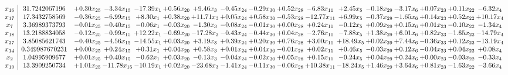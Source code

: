 \documentclass[9pt]{article}
\begin{document}
 \[\begin{array}{c| c c@{\hskip 2pt} c@{\hskip 2pt} c@{\hskip 2pt} c@{\hskip 2pt} c@{\hskip 2pt} c@{\hskip 2pt} c@{\hskip 2pt} c@{\hskip 2pt} c@{\hskip 2pt} c@{\hskip 2pt} c@{\hskip 2pt} c@{\hskip 2pt} c@{\hskip 2pt} c@{\hskip 2pt} c@{\hskip 2pt} }
 x_{16}   &  31.7242067196 & +  0.30 x_{25} & -3.34 x_{15} & -17.39 x_{1} & +  0.56 x_{20} & +  9.46 x_{3} & -0.45 x_{24} & -0.29 x_{30} & +  0.52 x_{28} & -6.83 x_{11} & +  2.45 x_{5} & -0.18 x_{29} & -3.17 x_{6} & +  0.07 x_{23} & +  0.11 x_{22} & -6.32 x_{4}\\
 x_{17}   &  17.3432758569 & -0.36 x_{25} & -6.99 x_{15} & +  8.30 x_{1} & +  0.38 x_{20} & + 11.71 x_{3} & +  0.05 x_{24} & +  0.58 x_{30} & -0.53 x_{28} & -12.77 x_{11} & +  6.99 x_{5} & -0.37 x_{29} & -1.65 x_{6} & +  0.14 x_{23} & +  0.52 x_{22} & + 10.17 x_{4}\\
 x_{7}   &  3.36989373793 & -0.01 x_{25} & -0.40 x_{15} & -0.06 x_{1} & -0.03 x_{20} & -1.30 x_{3} & -0.08 x_{24} & -0.01 x_{30} & +  0.00 x_{28} & +  0.24 x_{11} & -0.12 x_{5} & +  0.09 x_{29} & +  0.15 x_{6} & +  0.01 x_{23} & -0.10 x_{22} & -1.34 x_{4}\\
 x_{18}   &  13.2188834058 & -0.12 x_{25} & -0.99 x_{15} & + 12.22 x_{1} & -0.69 x_{20} & -17.28 x_{3} & -0.43 x_{24} & -0.44 x_{30} & +  0.04 x_{28} & -2.76 x_{11} & -7.88 x_{5} & +  1.38 x_{29} & +  6.01 x_{6} & +  0.82 x_{23} & -1.65 x_{22} & -14.79 x_{4}\\
 x_{27}   &  3.85085621743 & -0.40 x_{25} & -4.56 x_{15} & -14.55 x_{1} & +  0.03 x_{20} & +  3.19 x_{3} & +  0.39 x_{24} & +  0.20 x_{30} & +  0.76 x_{28} & +  3.00 x_{11} & + 18.49 x_{5} & +  0.02 x_{29} & +  7.44 x_{6} & -0.36 x_{23} & +  0.12 x_{22} & -13.19 x_{4}\\
 x_{14}   &  0.349987670231 & +  0.00 x_{25} & +  0.24 x_{15} & +  0.31 x_{1} & +  0.04 x_{20} & +  0.58 x_{3} & +  0.01 x_{24} & +  0.04 x_{30} & -0.01 x_{28} & +  0.02 x_{11} & +  0.46 x_{5} & -0.03 x_{29} & +  0.12 x_{6} & -0.04 x_{23} & +  0.04 x_{22} & +  0.08 x_{4}\\
 x_{2}   &  1.04995909677 & +  0.01 x_{25} & +  0.40 x_{15} & -0.62 x_{1} & +  0.03 x_{20} & -0.13 x_{3} & -0.04 x_{24} & -0.02 x_{30} & +  0.05 x_{28} & +  0.15 x_{11} & -0.24 x_{5} & +  0.04 x_{29} & +  0.24 x_{6} & +  0.00 x_{23} & -0.03 x_{22} & -0.33 x_{4}\\
 x_{19}   &  13.3909250734 & +  1.01 x_{25} & -11.78 x_{15} & -10.19 x_{1} & +  0.02 x_{20} & -23.68 x_{3} & -1.41 x_{24} & -0.11 x_{30} & -0.06 x_{28} & + 10.38 x_{11} & -18.24 x_{5} & +  1.46 x_{29} & +  3.64 x_{6} & +  0.81 x_{23} & -1.63 x_{22} & -3.66 x_{4}\\

\end{array}\]
\end{document}
